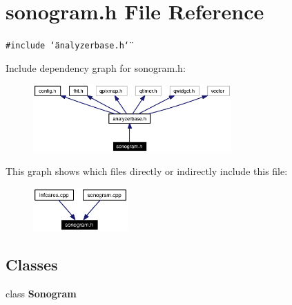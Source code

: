 \section{sonogram.h File Reference}
\label{sonogram_8h}


{\tt \#include \char`\"{}analyzerbase.h\char`\"{}}\par


Include dependency graph for sonogram.h:\begin{figure}[H]
\begin{center}
\leavevmode
\includegraphics[width=215pt]{sonogram_8h__incl}
\end{center}
\end{figure}


This graph shows which files directly or indirectly include this file:\begin{figure}[H]
\begin{center}
\leavevmode
\includegraphics[width=103pt]{sonogram_8h__dep__incl}
\end{center}
\end{figure}
\subsection*{Classes}
\begin{CompactItemize}
\item 
class {\bf Sonogram}
\end{CompactItemize}
